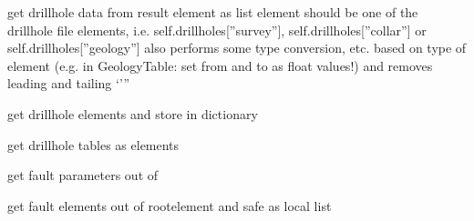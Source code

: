 \documentclass[letterpaper,10pt,english]{sphinxmanual}
\begin{document}
\begin{fulllineitems}
\begin{fulllineitems}
\label{pygeomod:pygeomod.geomodeller_xml_obj.GeomodellerClass.get_drillhole_data}
get drillhole data from result element as list
element should be one of the drillhole file elements, i.e.
self.drillholes{[}''survey''{]}, self.drillholes{[}''collar''{]} 
or self.drillholes{[}''geology''{]} 
also performs some type conversion, etc. based on type
of element (e.g. in GeologyTable: set from and to as float values!)
and removes leading and tailing `'''

\end{fulllineitems}


\begin{fulllineitems}
\label{pygeomod:pygeomod.geomodeller_xml_obj.GeomodellerClass.get_drillhole_elements}
get drillhole elements and store in dictionary

\end{fulllineitems}


\begin{fulllineitems}
\label{pygeomod:pygeomod.geomodeller_xml_obj.GeomodellerClass.get_drillholes_old}
get drillhole tables as elements

\end{fulllineitems}


\begin{fulllineitems}
\label{pygeomod:pygeomod.geomodeller_xml_obj.GeomodellerClass.get_fault_parameters}
get fault parameters out of

\end{fulllineitems}


\begin{fulllineitems}
\label{pygeomod:pygeomod.geomodeller_xml_obj.GeomodellerClass.get_faults}
get fault elements out of rootelement and safe as local list


\end{fulllineitems}
\end{fulllineitems}
\end{document}
